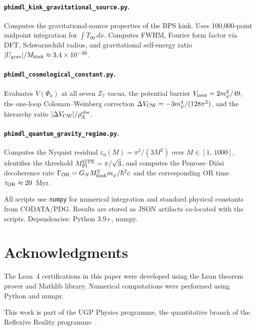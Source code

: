 \documentclass[11pt]{article}
\theoremstyle{remark}
\newcommand{\GTE}{\text{GTE}}
\newcommand{\ZS}{\mathbb{Z}_7}
\newcommand{\Mkink}{M_{\rm kink}}
\newcommand{\epsz}{\varepsilon_0}
\newcommand{\GN}{G_N}
\newcommand{\MPltot}{M_{\rm Pl}^{\GTE}}
\newcommand{\rhoLam}{\rho_\Lambda}
\begin{document}
\begin{appendices}
\paragraph{\texttt{phimdl\_kink\_gravitational\_source.py}.}
Computes the gravitational-source properties of the BPS kink.
Uses 100,000-point midpoint integration for $\int T_{00}\,dx$.
Computes FWHM, Fourier form factor via DFT, Schwarzschild radius, and
gravitational self-energy ratio $|U_{\rm grav}|/\Mkink \approx 3.4\times10^{-39}$.

\paragraph{\texttt{phimdl\_cosmological\_constant.py}.}
Evaluates $V(\Phi_k)$ at all seven $\ZS$ vacua, the potential barrier
$V_{\rm max} = 2m_\varphi^2/49$, the one-loop Coleman--Weinberg correction
$\Delta V_{\rm CW} = -3m_\varphi^4/(128\pi^2)$, and the hierarchy ratio
$|\Delta V_{\rm CW}|/\rhoLam^{\rm obs}$.

\paragraph{\texttt{phimdl\_quantum\_gravity\_regime.py}.}
Computes the Nyquist residual $\epsz(M) = \pi^2/(3M^2)$ over $M \in [1,\,1000]$,
identifies the threshold $\MPltot = \pi/\sqrt{3}$, and computes the Penrose--Di\'{o}si
decoherence rate $\Gamma_{\rm OR} = \GN\Mkink^2 m_\varphi/\hbar^2 c$ and the
corresponding OR time $\tau_{\rm OR} \approx 20$~Myr.

All scripts use \texttt{numpy} for numerical integration and standard physical
constants from CODATA/PDG.
Results are stored as JSON artifacts co-located with the scripts.
Dependencies: Python 3.9+, numpy.

\end{appendices}

\section*{Acknowledgments}

The Lean~4 certifications in this paper were developed using the Lean theorem
prover and Mathlib library.
Numerical computations were performed using Python and numpy.

This work is part of the UGP Physics programme, the quantitative branch of the Reflexive Reality programme~\cite{SpivackResearchProgrammes}.



\end{document}
